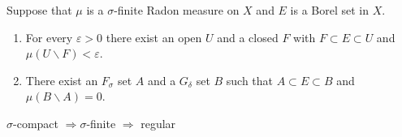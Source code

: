 \documentclass[12pt, a4paper, oneside]{book}
\begin{document}
\begin{corollary}
    Suppose that $\mu$ is a $\sigma$-finite Radon measure on $X$ and $E$ is a Borel set in $X$.
    \begin{enumerate}
        \item
              For every $\varepsilon>0$ there exist an open $U$ and a closed $F$ with $F \subset E \subset U$ and $\mu(U \backslash F)<\varepsilon$.
        \item
              There exist an $F_\sigma$ set $A$ and a $G_\delta$ set $B$ such that $A \subset E \subset B$ and $\mu(B \backslash A)=0$.
    \end{enumerate}
\end{corollary}

\begin{corollary}
    $\sigma$-compact $\Rightarrow \sigma$-finite $\Rightarrow $ regular
\end{corollary}
\end{document}

